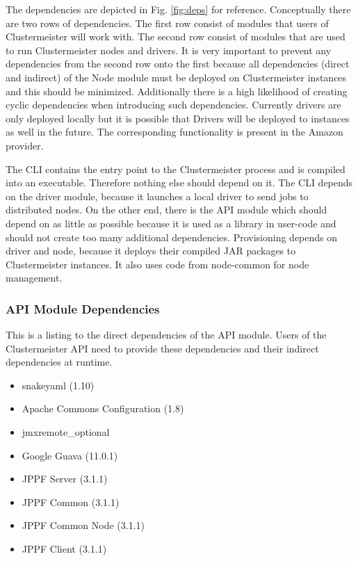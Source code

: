 \documentclass[english]{uzhpub}
\begin{document}
The dependencies are depicted in Fig. \ref{fig:deps} for reference. Conceptually there are two rows of dependencies. The first row consist of modules that users of Clustermeister will work with. The second row consist of modules that are used to run Clustermeister nodes and drivers. It is very important to prevent any dependencies from the second row onto the first because all dependencies (direct and indirect) of the Node module must be deployed on Clustermeister instances and this should be minimized. Additionally there is a high likelihood of creating cyclic dependencies when introducing such dependencies. Currently drivers are only deployed locally but it is possible that Drivers will be deployed to instances as well in the future. The corresponding functionality is present in the Amazon provider. 

The CLI contains the entry point to the Clustermeister process and is compiled into an executable. Therefore nothing else should depend on it. The CLI depends on the driver module, because it launches a local driver to send jobs to distributed nodes. On the other end, there is the API module which should depend on as little as possible because it is used as a library in user-code and should not create too many additional dependencies. Provisioning depends on driver and node, because it deploys their compiled JAR packages to Clustermeister instances. It also uses code from node-common for node management.

\subsubsection{API Module Dependencies}
This is a listing to the direct dependencies of the API module. Users of the Clustermeister API need to provide these dependencies and their indirect dependencies at runtime.

\begin{itemize}
 \item snakeyaml (1.10)
 \item Apache Commons Configuration (1.8)
 \item jmxremote\_optional
 \item Google Guava (11.0.1)
 \item JPPF Server (3.1.1)
 \item JPPF Common (3.1.1)
 \item JPPF Common Node (3.1.1)
 \item JPPF Client (3.1.1)
\end{itemize} 
\end{document}
